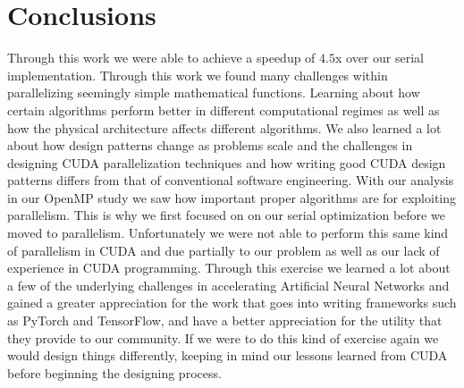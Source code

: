 \section{Conclusions}\label{sec:conclusions}
Through this work we were able to achieve a speedup of $4.5$x over our serial
implementation. Through this work we found many challenges within parallelizing
seemingly simple mathematical functions. Learning about how certain algorithms
perform better in different computational regimes as well as how the physical
architecture affects different algorithms. We also learned a lot about how
design patterns change as problems scale and the challenges in designing CUDA
parallelization techniques and how writing good CUDA design patterns differs
from that of conventional software engineering. With our analysis in our OpenMP
study we saw how important proper algorithms are for exploiting parallelism.
This is why we first focused on on our serial optimization before we moved to
parallelism. Unfortunately we were not able to perform this same kind of
parallelism in CUDA and due partially to our problem as well as our lack of
experience in CUDA programming.
Through this exercise we learned
a lot about a few of the underlying challenges in accelerating Artificial Neural
Networks and gained a greater appreciation for the work that goes into writing
frameworks such as PyTorch and TensorFlow, and have a better appreciation for
the utility that they provide to our community.
If we were to do this kind of exercise again we would design things differently,
keeping in mind our lessons learned from CUDA before beginning the designing
process. 

%
%
%
